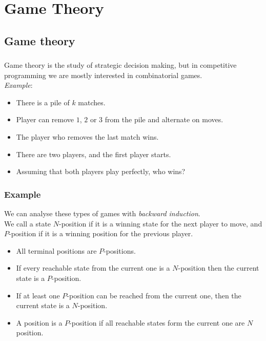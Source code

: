 \documentclass[10pt]{beamer}
\newcommand{\bi}{\begin{itemize}}
\newcommand{\ei}{\end{itemize}}
\begin{document}

\section{Game Theory}
\subsection{Game theory}
\begin{frame}
  \frametitle{\insertsubsection}
  \vspace{20pt}
  Game theory is the study of strategic decision making, but in competitive
  programming we are mostly interested in combinatorial games. \\
  \emph{Example}:
  \bi
    \item There is a pile of $k$ matches.
    \item Player can remove $1$, $2$ or $3$ from the pile and alternate on moves.
    \item The player who removes the last match wins.
    \item There are two players, and the first player starts.
    \item Assuming that both players play perfectly, who wins?
  \ei
\end{frame}

\begin{frame}
  \frametitle{Example}
  \vspace{10pt}
  We can analyse these types of games with \emph{backward induction}.\\ 
  We call a state $N$-position if it is a winning state for the next player to
  move, and $P$-position if it is a winning position for the previous player.
  \bi
    \item All terminal positions are $P$-positions.
    \item If every reachable state from the current one is a $N$-position then
      the current state is a $P$-position.
    \item If at least one $P$-position can be reached from the current one,
      then the current state is a $N$-position.
    \item A position is a $P$-position if all reachable states form the current
      one are $N$ position.
  \ei
\end{frame}
\end{document}
